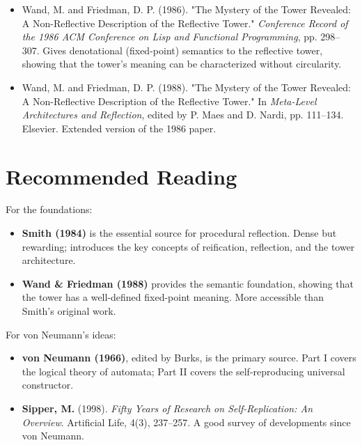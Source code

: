 \begin{itemize}
\item Wand, M. and Friedman, D. P. (1986). "The Mystery of the Tower Revealed: A Non-Reflective Description of the Reflective Tower." \textit{Conference Record of the 1986 ACM Conference on Lisp and Functional Programming}, pp. 298--307. Gives denotational (fixed-point) semantics to the reflective tower, showing that the tower's meaning can be characterized without circularity.
\end{itemize}

\begin{itemize}
\item Wand, M. and Friedman, D. P. (1988). "The Mystery of the Tower Revealed: A Non-Reflective Description of the Reflective Tower." In \textit{Meta-Level Architectures and Reflection}, edited by P. Maes and D. Nardi, pp. 111--134. Elsevier. Extended version of the 1986 paper.
\end{itemize}



\section{Recommended Reading}

For the foundations:

\begin{itemize}
\item \textbf{Smith (1984)} is the essential source for procedural reflection. Dense but rewarding; introduces the key concepts of reification, reflection, and the tower architecture.
\end{itemize}

\begin{itemize}
\item \textbf{Wand \& Friedman (1988)} provides the semantic foundation, showing that the tower has a well-defined fixed-point meaning. More accessible than Smith's original work.
\end{itemize}

For von Neumann's ideas:

\begin{itemize}
\item \textbf{von Neumann (1966)}, edited by Burks, is the primary source. Part I covers the logical theory of automata; Part II covers the self-reproducing universal constructor.
\end{itemize}

\begin{itemize}
\item \textbf{Sipper, M.} (1998). \textit{Fifty Years of Research on Self-Replication: An Overview}. Artificial Life, 4(3), 237--257. A good survey of developments since von Neumann.
\end{itemize}

